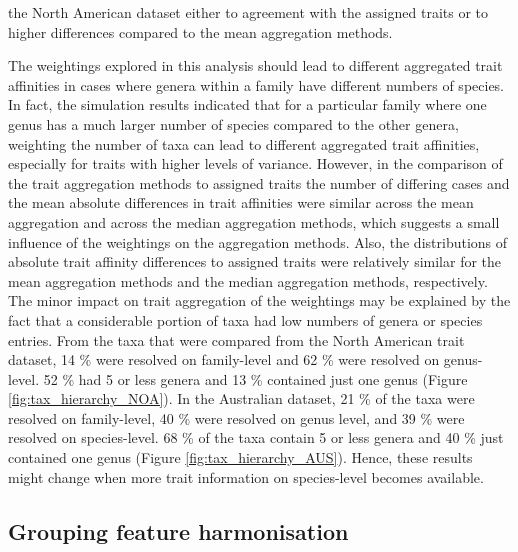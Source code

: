 \documentclass{article}
\begin{document}
the North American dataset either to agreement with the assigned traits or to higher differences compared to the mean aggregation methods. 

The weightings explored in this analysis should lead to different aggregated trait affinities in cases where genera within a family have different numbers of species. In fact, the simulation results indicated that for a particular family where one genus has a much larger number of species compared to the other genera, weighting the number of taxa can lead to different aggregated trait affinities, especially for traits with higher levels of variance. However, in the comparison of the trait aggregation methods to assigned traits the number of differing cases and the mean absolute differences in trait affinities were similar across the mean aggregation and across the median aggregation methods, which suggests a small influence of the weightings on the aggregation methods. Also, the distributions of absolute trait affinity differences to assigned traits were relatively similar for the mean aggregation methods and the median aggregation methods, respectively. The minor impact on trait aggregation of the weightings may be explained by the fact that a considerable portion of taxa had low numbers of genera or species entries. From the taxa that were compared from the North American trait dataset, 14 \% were resolved on family-level and 62 \% were resolved on genus-level. 52 \% had 5 or less genera and 13 \% contained just one genus (Figure \ref{fig:tax_hierarchy_NOA}). In the Australian dataset, 21 \% of the taxa were resolved on family-level, 40 \% were resolved on genus level, and 39 \% were resolved on species-level. 68 \% of the taxa contain 5 or less genera and 40 \% just contained one genus (Figure \ref{fig:tax_hierarchy_AUS}). Hence, these results might change when more trait information on species-level becomes available. 

\subsection*{Grouping feature harmonisation}
\end{document}
